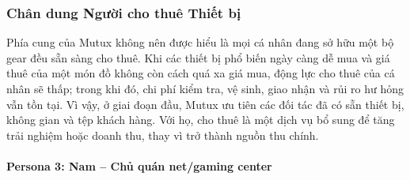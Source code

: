 
\subsubsection{Chân dung Người cho thuê Thiết bị}

Phía cung của Mutux không nên được hiểu là mọi cá nhân đang sở hữu một bộ gear đều sẵn sàng cho thuê. Khi các thiết bị phổ biến ngày càng dễ mua và giá thuê của một món đồ không còn cách quá xa giá mua, động lực cho thuê của cá nhân sẽ thấp; trong khi đó, chi phí kiểm tra, vệ sinh, giao nhận và rủi ro hư hỏng vẫn tồn tại. Vì vậy, ở giai đoạn đầu, Mutux ưu tiên các đối tác đã có sẵn thiết bị, không gian và tệp khách hàng. Với họ, cho thuê là một dịch vụ bổ sung để tăng trải nghiệm hoặc doanh thu, thay vì trở thành nguồn thu chính.

\paragraph{Persona 3: Nam -- Chủ quán net/gaming center}


